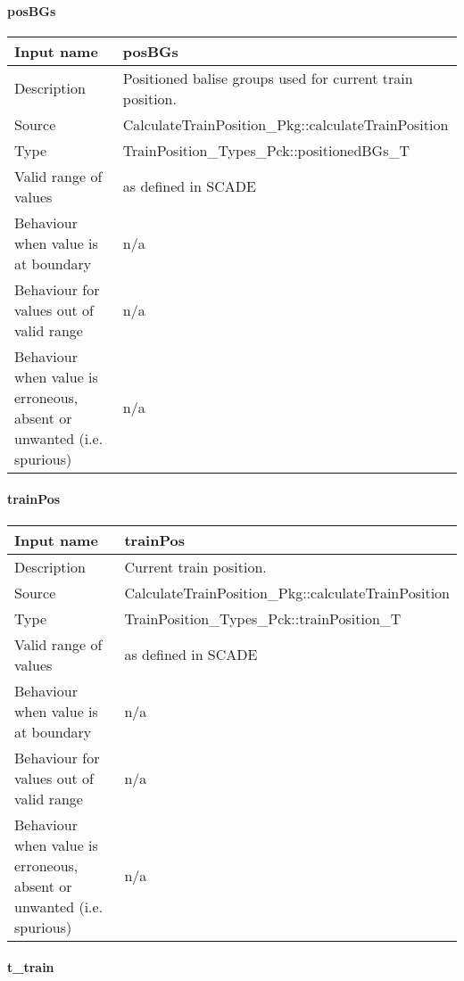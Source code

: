 \paragraph{posBGs}

\begin{longtable}{p{}p{}}
\toprule
Input name				& posBGs \\
\midrule
Description				& Positioned balise groups used for current train position. \\
\midrule
Source					& CalculateTrainPosition\_Pkg::calculateTrainPosition \\ 
\midrule
Type					& TrainPosition\_Types\_Pck::positionedBGs\_T \\
\midrule
Valid range of values	& as defined in SCADE \\
\midrule
Behaviour when value is at boundary	& n/a \\
\midrule
Behaviour for values out of valid range	& n/a \\
\midrule
Behaviour when value is erroneous, absent or unwanted (i.e. spurious) & n/a \\
\bottomrule
\end{longtable}

\paragraph{trainPos}

\begin{longtable}{p{}p{}}
\toprule
Input name				& trainPos \\
\midrule
Description				& Current train position. \\
\midrule
Source					& CalculateTrainPosition\_Pkg::calculateTrainPosition \\ 
\midrule
Type					& TrainPosition\_Types\_Pck::trainPosition\_T \\
\midrule
Valid range of values	& as defined in SCADE \\
\midrule
Behaviour when value is at boundary	& n/a \\
\midrule
Behaviour for values out of valid range	& n/a \\
\midrule
Behaviour when value is erroneous, absent or unwanted (i.e. spurious) & n/a \\
\bottomrule
\end{longtable}

\paragraph{t\_train}

